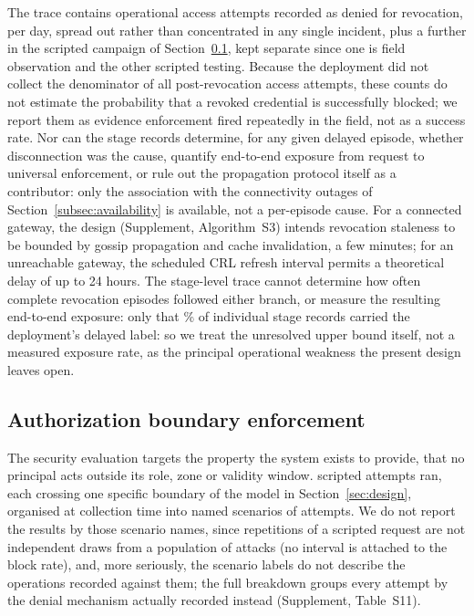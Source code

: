 \documentclass[a4paper,fleqn]{cas-dc}
\begin{document}
The trace contains \RevDenialsOperational{} operational access attempts
recorded as denied for revocation, \RevDenialsPerDay{} per day, spread out
rather than concentrated in any single incident, plus a further
\RevDenialsCampaign{} in the scripted campaign of
Section~\ref{subsec:security}, kept separate since one is field
observation and the other scripted testing. Because the deployment did
not collect the denominator of all post-revocation access attempts, these
counts do not estimate the probability that a revoked credential is
successfully blocked; we report them as evidence enforcement fired
repeatedly in the field, not as a success rate. Nor can the stage records
determine, for any given delayed episode, whether disconnection was the
cause, quantify end-to-end exposure from request to universal enforcement,
or rule out the propagation protocol itself as a contributor: only the
association with the connectivity outages of
Section~\ref{subsec:availability} is available, not a per-episode cause.
For a connected gateway, the design (Supplement, Algorithm~S3) intends
revocation staleness to be bounded by gossip propagation and cache
invalidation, a few minutes; for an unreachable gateway, the scheduled
CRL refresh interval permits a theoretical delay of up to 24 hours. The
stage-level trace cannot determine how often complete revocation
episodes followed either branch, or measure the resulting end-to-end
exposure: only that \RevDelayedPct\% of individual stage records
carried the deployment's delayed label: so we treat the unresolved
upper bound itself, not a measured exposure rate, as the principal
operational weakness the present design leaves open.

\subsection{Authorization boundary enforcement}
\label{subsec:security}

The security evaluation targets the property the system exists to provide,
that no principal acts outside its role, zone or validity window.
\SecAttempts{} scripted attempts ran, each crossing one specific boundary of
the model in Section~\ref{sec:design}, organised at collection time into
\SecScenarios{} named scenarios of \SecPerScenario{} attempts. We do not
report the results by those scenario names, since repetitions of a
scripted request are not independent draws from a population of attacks
(no interval is attached to the block rate), and, more seriously, the
scenario labels do not describe the operations recorded against them; the
full breakdown groups every attempt by the denial mechanism actually
recorded instead (Supplement, Table~S11).
\end{document}

